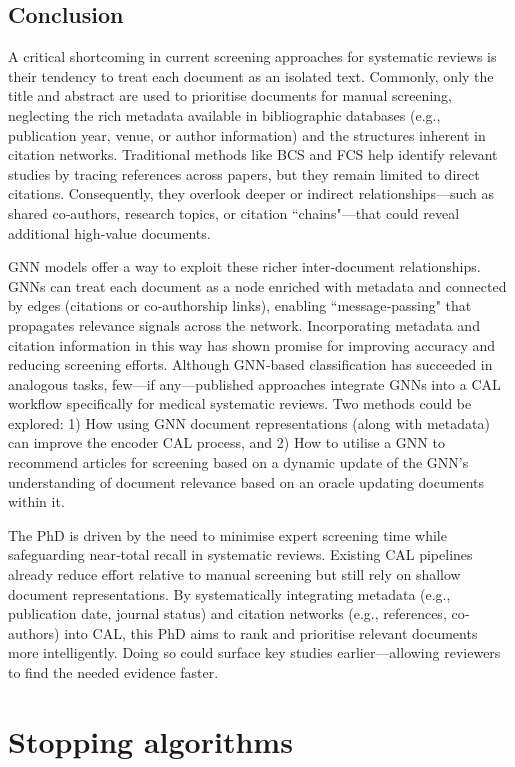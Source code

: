 \documentclass[10pt,oneside]{book}
\begin{document}
\subsection{Conclusion}

A critical shortcoming in current screening approaches for systematic reviews is their tendency to treat each document as an isolated text. Commonly, only the title and abstract are used to prioritise documents for manual screening, neglecting the rich metadata available in bibliographic databases (e.g., publication year, venue, or author information) and the structures inherent in citation networks. Traditional methods like BCS and FCS help identify relevant studies by tracing references across papers, but they remain limited to direct citations. Consequently, they overlook deeper or indirect relationships—such as shared co‐authors, research topics, or citation ``chains"—that could reveal additional high‐value documents.

GNN models offer a way to exploit these richer inter‐document relationships. GNNs can treat each document as a node enriched with metadata and connected by edges (citations or co‐authorship links), enabling ``message‐passing" that propagates relevance signals across the network. Incorporating metadata and citation information in this way has shown promise for improving accuracy and reducing screening efforts. Although GNN‐based classification has succeeded in analogous tasks, few—if any—published approaches integrate GNNs into a CAL workflow specifically for medical systematic reviews. Two methods could be explored: 1) How using GNN document representations (along with metadata) can improve the encoder CAL process, and 2) How to utilise a GNN to recommend articles for screening based on a dynamic update of the GNN's understanding of document relevance based on an oracle updating documents within it. 

The PhD is driven by the need to minimise expert screening time while safeguarding near‐total recall in systematic reviews. Existing CAL pipelines already reduce effort relative to manual screening but still rely on shallow document representations. By systematically integrating metadata (e.g., publication date, journal status) and citation networks (e.g., references, co‐authors) into CAL, this PhD aims to rank and prioritise relevant documents more intelligently. Doing so could surface key studies earlier—allowing reviewers to find the needed evidence faster.


\newpage
\section{Stopping algorithms}
\end{document}
